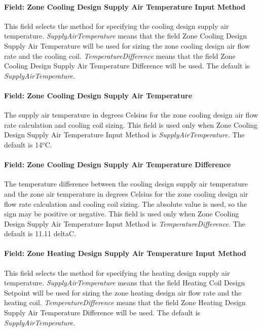 \paragraph{Field: Zone Cooling Design Supply Air Temperature Input Method}\label{field-zone-cooling-design-supply-air-temperature-input-method-4}

This field selects the method for specifying the cooling design supply air temperature. \emph{SupplyAirTemperature} means that the field Zone Cooling Design Supply Air Temperature will be used for sizing the zone cooling design air flow rate and the cooling coil. \emph{TemperatureDifference} means that the field Zone Cooling Design Supply Air Temperature Difference will be used. The default is \emph{SupplyAirTemperature.}

\paragraph{Field: Zone Cooling Design Supply Air Temperature}\label{field-zone-cooling-design-supply-air-temperature-3}

The supply air temperature in degrees Celsius for the zone cooling design air flow rate calculation and cooling coil sizing. This field is used only when Zone Cooling Design Supply Air Temperature Input Method is \emph{SupplyAirTemperature.} The default is 14\(^{o}\)C.

\paragraph{Field: Zone Cooling Design Supply Air Temperature Difference}\label{field-zone-cooling-design-supply-air-temperature-difference-4}

The temperature difference between the cooling design supply air temperature and the zone air temperature in degrees Celsius for the zone cooling design air flow rate calculation and cooling coil sizing. The absolute value is used, so the sign may be positive or negative. This field is used only when Zone Cooling Design Supply Air Temperature Input Method is \emph{TemperatureDifference.} The default is 11.11 deltaC.

\paragraph{Field: Zone Heating Design Supply Air Temperature Input Method}\label{field-zone-heating-design-supply-air-temperature-input-method-4}

This field selects the method for specifying the heating design supply air temperature. \emph{SupplyAirTemperature} means that the field Heating Coil Design Setpoint will be used for sizing the zone heating design air flow rate and the heating coil. \emph{TemperatureDifference} means that the field Zone Heating Design Supply Air Temperature Difference will be used. The default is \emph{SupplyAirTemperature.}


